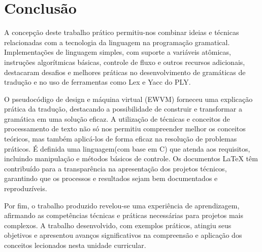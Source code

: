 \documentclass[12pt,a4paper]{report}
\begin{document}
\chapter{Conclus\~{a}o}
A concepção deste trabalho prático permitiu-nos combinar ideias e técnicas relacionadas com a tecnologia da linguagem na programação gramatical. Implementações de linguagem simples, com suporte a variáveis atômicas, instruções algorítmicas básicas, controle de fluxo e outros recursos adicionais, destacaram desafios e melhores práticas no desenvolvimento de gramáticas de tradução e no uso de ferramentas como Lex e Yacc do PLY.

O pseudocódigo de design e máquina virtual (EWVM) forneceu uma explicação prática da tradução, destacando a possibilidade de construir e transformar a gramática em uma solução eficaz. A utilização de técnicas e conceitos de processamento de texto não só nos permitiu compreender melhor os conceitos teóricos, mas também aplicá-los de forma eficaz na resolução de problemas práticos. É definida uma linguagem(com base em C) que atenda aos requisitos, incluindo manipulação e métodos básicos de controle. Os documentos LaTeX têm contribuído para a transparência na apresentação dos projetos técnicos, garantindo que os processos e resultados sejam bem documentados e reproduzíveis.

Por fim, o trabalho produzido revelou-se uma experiência de aprendizagem, afirmando as competências técnicas e práticas necessárias para projetos mais complexos. A trabalho desenvolvido, com exemplos práticos, atingiu seus objetivos e apresentou avanços significativos na compreensão e aplicação dos conceitos lecionados nesta unidade curricular.
\end{document}
